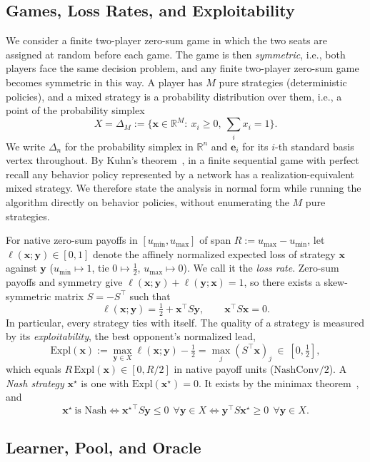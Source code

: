 \documentclass{article}
\theoremstyle{plain}
\theoremstyle{remark}
\newcommand{\Expl}{\mathrm{Expl}}
\newcommand{\simplex}{\Delta}
\newcommand{\bx}{{\bm{x}}}
\newcommand{\by}{{\bm{y}}}
\newcommand{\be}{{\bm{e}}}
\newcommand{\xs}{\bx^{\star}}
\begin{document}
\subsection{Games, Loss Rates, and Exploitability}

We consider a finite two-player zero-sum game in which the two seats are assigned at random before each game. The game is then \emph{symmetric}, i.e., both players face the same decision problem, and any finite two-player zero-sum game becomes symmetric in this way. A player has $M$ pure strategies (deterministic policies), and a mixed strategy is a probability distribution over them, i.e., a point of the probability simplex
\[
X=\simplex_M:=\Big\{\bx\in\mathbb R^M:\ x_i\ge0,\ \textstyle\sum_ix_i=1\Big\}.
\]
We write $\simplex_n$ for the probability simplex in $\mathbb R^n$ and $\be_i$ for its $i$-th standard basis vertex throughout. By Kuhn's theorem~\citep{kuhn1953}, in a finite sequential game with perfect recall any behavior policy represented by a network has a realization-equivalent mixed strategy. We therefore state the analysis in normal form while running the algorithm directly on behavior policies, without enumerating the $M$ pure strategies.

For native zero-sum payoffs in $[u_{\min},u_{\max}]$ of span $R:=u_{\max}-u_{\min}$, let $\ell(\bx;\by)\in[0,1]$ denote the affinely normalized expected loss of strategy $\bx$ against $\by$ ($u_{\min}\mapsto1$, tie $0\mapsto\tfrac12$, $u_{\max}\mapsto0$). We call it the \emph{loss rate}. Zero-sum payoffs and symmetry give $\ell(\bx;\by)+\ell(\by;\bx)=1$, so there exists a skew-symmetric matrix $S=-S^\top$ such that
\[
\ell(\bx;\by)=\tfrac12+\bx^\top S\by,\qquad \bx^\top S\bx=0 .
\]
In particular, every strategy ties with itself. The quality of a strategy is measured by its \emph{exploitability}, the best opponent's normalized lead,
\[
\Expl(\bx):=\max_{\by\in X}\ell(\bx;\by)-\tfrac12=\max_j(S^\top \bx)_j\ \in\ [0,\tfrac12] ,
\]
which equals $R\,\Expl(\bx)\in[0,R/2]$ in native payoff units ($\mathrm{NashConv}/2$). A \emph{Nash strategy} $\xs$ is one with $\Expl(\xs)=0$. It exists by the minimax theorem~\citep{vonneumann1928}, and
\begin{equation}
\xs\ \text{is Nash}\iff {\xs}^\top S\by\le0\ \ \forall \by\in X\iff \by^\top S\xs\ge0\ \ \forall \by\in X .
\label{eq:nash}
\end{equation}

\subsection{Learner, Pool, and Oracle}
\label{sec:setting}
\end{document}
